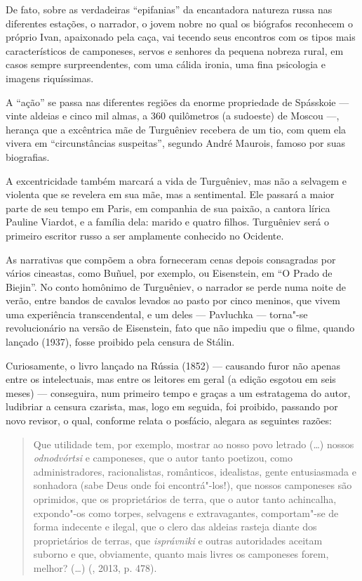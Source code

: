 De fato, sobre as verdadeiras ``epifanias'' da encantadora natureza russa nas diferentes estações, o narrador, o jovem nobre no qual os biógrafos reconhecem o próprio Ivan, apaixonado pela caça, vai tecendo seus encontros com os tipos mais característicos de camponeses, servos e senhores da pequena nobreza rural, em casos sempre surpreendentes, com uma cálida ironia, uma fina psicologia e imagens riquíssimas.

A ``ação'' se passa nas diferentes regiões da enorme propriedade de Spásskoie --- vinte aldeias e cinco mil almas, a 360 quilômetros (a sudoeste) de Moscou ---, herança que a excêntrica mãe de Turguêniev recebera de um tio, com quem ela vivera em ``circunstâncias suspeitas'', segundo André Maurois, famoso por suas biografias.

A excentricidade também marcará a vida de Turguêniev, mas não a selvagem e violenta que se revelera em sua mãe, mas a sentimental. Ele passará a maior parte de seu tempo em Paris, em companhia de sua paixão, a cantora lírica Pauline Viardot, e a família dela: marido e quatro filhos. Turguêniev será o primeiro escritor russo a ser amplamente conhecido no
Ocidente.

As narrativas que compõem a obra forneceram cenas depois consagradas por vários cineastas, como Buñuel, por exemplo, ou Eisenstein, em ``O Prado de Biejin''. No conto homônimo de Turguêniev, o narrador se perde numa noite de verão, entre bandos de cavalos levados ao pasto por cinco meninos, que vivem uma experiência transcendental, e um deles --- Pavluchka --- torna"-se revolucionário na versão de Eisenstein, fato que não impediu que o filme, quando lançado (1937), fosse proibido pela censura de Stálin.

Curiosamente, o livro lançado na Rússia (1852) --- causando furor não apenas entre os intelectuais, mas entre os leitores em geral (a edição esgotou em seis meses) --- conseguira, num primeiro tempo e graças a um estratagema do autor, ludibriar a censura czarista, mas, logo em seguida, foi proibido, passando por novo revisor, o qual, conforme relata o posfácio, alegara as seguintes razões:

\begin{quotation}
Que utilidade tem, por exemplo, mostrar ao nosso povo letrado (\ldots{}) nossos \emph{odnodvórtsi} e camponeses, que o autor tanto poetizou, como administradores, racionalistas, românticos, idealistas, gente entusiasmada e sonhadora (sabe Deus onde foi encontrá"-los!), que nossos camponeses são oprimidos, que os proprietários de terra, que o autor tanto achincalha, expondo"-os como torpes, selvagens e extravagantes, comportam"-se de forma indecente e ilegal, que o clero das aldeias rasteja diante dos proprietários de terras, que \emph{isprávniki} e outras autoridades aceitam suborno e que, obviamente, quanto mais livres
os camponeses forem, melhor? (\ldots{}) (, 2013, p. 478).
\end{quotation}

